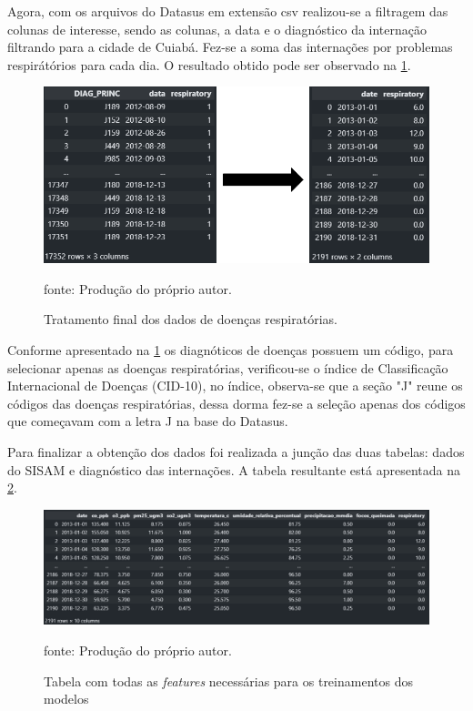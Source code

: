 \documentclass[
  12pt,		%
  a4paper,	%
  openright,%
  oneside,	%
  chapter=TITLE,		%
  section=TITLE,		%
  english,	%
  french,	%
  spanish,	%
  brazil	%
]{abntex2}
\begin{document}
    Agora, com os arquivos do Datasus em extensão csv realizou-se a filtragem das colunas de interesse, sendo as colunas, a data e o
    diagnóstico da internação filtrando para a cidade de Cuiabá. Fez-se a soma das internações por problemas
    respirátórios para cada dia. O resultado obtido pode ser observado na \ref*{resp_dataset}.

    \begin{figure}[ht]
        \centering
        \caption{Tratamento final dos dados de doenças respiratórias.}
        \includegraphics[width=12cm]{../reports/figures/filter_csv_resp.png}
        \label{resp_dataset}
        \par
        {\small fonte: Produção do próprio autor.}
    \end{figure}

    Conforme apresentado na \ref*{resp_dataset} os diagnóticos de doenças possuem um código, para selecionar apenas as doenças
    respiratórias, verificou-se o índice de Classificação Internacional de Doenças (CID-10), no índice, observa-se que a 
    seção "J" reune os códigos das doenças respiratórias, dessa dorma fez-se a seleção apenas dos códigos que começavam com a letra J
    na base do Datasus.

    Para finalizar a obtenção dos dados foi realizada a junção das duas tabelas: dados do SISAM e diagnóstico das internações. 
    A tabela resultante está apresentada na \ref*{tabela_completa}.

    \begin{figure}[ht]
        \centering
        \caption{Tabela com todas as \textit{features} necessárias para os treinamentos dos modelos}
        \includegraphics[width=12cm]{../reports/figures/df_complete.png}
        \label{tabela_completa}
        \par
        {\small fonte: Produção do próprio autor.}
    \end{figure}
\end{document}
